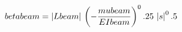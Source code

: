 $$betabeam=\left| Lbeam\right| \,\left(-{{mubeam}\over{EIbeam}}
 \right)^0.25\,\left| s\right| ^0.5$$
